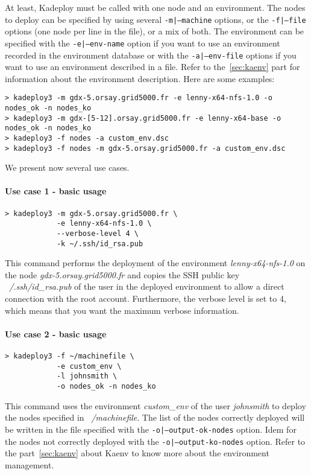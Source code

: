 \documentclass[a4wide,10pt,oneside]{book}
\begin{document}
At least, Kadeploy must be called with one node and an environment. The nodes to deploy can be specified by using several \texttt{-m|--machine} options, or the \texttt{-f|--file} options (one node per line in the file), or a mix of both.
The environment can be specified with the \texttt{-e|--env-name} option if you want to use an environment recorded in the environment database or with the \texttt{-a|--env-file} options if you want to use an environment described in a file. Refer to the~\ref{sec:kaenv} part for information about the environment description. Here are some examples:
\begin{verbatim}
> kadeploy3 -m gdx-5.orsay.grid5000.fr -e lenny-x64-nfs-1.0 -o nodes_ok -n nodes_ko
> kadeploy3 -m gdx-[5-12].orsay.grid5000.fr -e lenny-x64-base -o nodes_ok -n nodes_ko
> kadeploy3 -f nodes -a custom_env.dsc
> kadeploy3 -f nodes -m gdx-5.orsay.grid5000.fr -a custom_env.dsc
\end{verbatim}

We present now several use cases.

\paragraph{Use case 1 - basic usage}
\begin{verbatim}
> kadeploy3 -m gdx-5.orsay.grid5000.fr \
            -e lenny-x64-nfs-1.0 \
            --verbose-level 4 \
            -k ~/.ssh/id_rsa.pub
\end{verbatim}
This command performs the deployment of the environment \textit{lenny-x64-nfs-1.0} on the node \textit{gdx-5.orsay.grid5000.fr} and copies the SSH public key \textit{~/.ssh/id\_rsa.pub} of the user in the deployed environment to allow a direct connection with the root account. Furthermore, the verbose level is set to 4, which means that you want the maximum verbose information.

\paragraph{Use case 2 - basic usage}
\begin{verbatim}
> kadeploy3 -f ~/machinefile \
            -e custom_env \
            -l johnsmith \
            -o nodes_ok -n nodes_ko
\end{verbatim}
This command uses the environment \textit{custom\_env} of the user \textit{johnsmith} to deploy the nodes specified in \textit{~/machinefile}. The list of the nodes correctly deployed will be written in the file specified with the \texttt{-o|--output-ok-nodes} option. Idem for the nodes not correctly deployed with the \texttt{-o|--output-ko-nodes} option. Refer to the part~\ref{sec:kaenv} about Kaenv to know more about the environment management.
\end{document}
